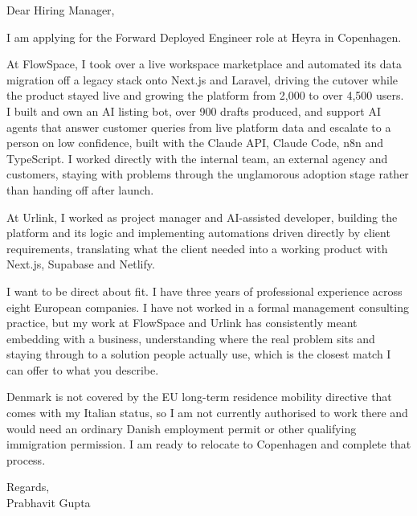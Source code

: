 \documentclass[a4paper,11pt]{article}
\begin{document}
Dear Hiring Manager,

I am applying for the Forward Deployed Engineer role at Heyra in Copenhagen.

At FlowSpace, I took over a live workspace marketplace and automated its data migration off a legacy stack onto Next.js and Laravel, driving the cutover while the product stayed live and growing the platform from 2,000 to over 4,500 users. I built and own an AI listing bot, over 900 drafts produced, and support AI agents that answer customer queries from live platform data and escalate to a person on low confidence, built with the Claude API, Claude Code, n8n and TypeScript. I worked directly with the internal team, an external agency and customers, staying with problems through the unglamorous adoption stage rather than handing off after launch.

At Urlink, I worked as project manager and AI-assisted developer, building the platform and its logic and implementing automations driven directly by client requirements, translating what the client needed into a working product with Next.js, Supabase and Netlify.

I want to be direct about fit. I have three years of professional experience across eight European companies. I have not worked in a formal management consulting practice, but my work at FlowSpace and Urlink has consistently meant embedding with a business, understanding where the real problem sits and staying through to a solution people actually use, which is the closest match I can offer to what you describe.

Denmark is not covered by the EU long-term residence mobility directive that comes with my Italian status, so I am not currently authorised to work there and would need an ordinary Danish employment permit or other qualifying immigration permission. I am ready to relocate to Copenhagen and complete that process.

Regards,\\
Prabhavit Gupta
\end{document}
